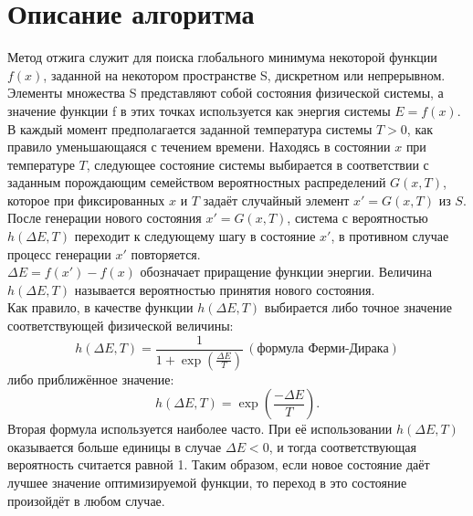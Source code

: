 \section{Описание алгоритма}
Метод отжига служит для поиска глобального минимума некоторой функции $f(x)$, заданной на некотором пространстве S, дискретном или непрерывном. Элементы множества S представляют собой состояния физической системы, а значение функции f в этих точках используется как энергия системы $E = f(x)$. \\
В каждый момент предполагается заданной температура системы $T > 0$, как правило уменьшающаяся с течением времени. Находясь в состоянии $x$ при температуре $T$, следующее состояние системы выбирается в соответствии с заданным порождающим семейством вероятностных распределений $G(x, T)$, которое при фиксированных $x$ и $T$ задаёт случайный элемент $x' = G(x, T)$ из $S$. \\ После генерации нового состояния $x' = G(x, T)$,
система с вероятностью $h(\Delta E, T)$ переходит к следующему шагу в состояние $x'$, в противном случае процесс генерации $x'$ повторяется.  \\
$\Delta E = f(x') - f(x)$ обозначает приращение функции энергии. Величина $h(\Delta E, T)$ называется вероятностью принятия нового состояния. \\
Как правило, в качестве функции $h(\Delta E, T)$ выбирается либо точное значение соответствующей физической величины:
$$
h(\Delta E, T) = \frac{1}{1 + \exp(\frac{\Delta E}{T})} \, (\text{формула Ферми-Дирака})
$$
либо приближённое значение: \\
$$
h(\Delta E, T) = \exp(\frac{-\Delta E}{T}).
$$
\noindent Вторая формула используется наиболее часто. При её использовании $h(\Delta E, T)$ оказывается больше единицы в случае $\Delta E < 0$, и тогда соответствующая вероятность считается равной 1. Таким образом, если новое состояние даёт лучшее значение оптимизируемой функции, то переход в это состояние произойдёт в любом случае. \\

